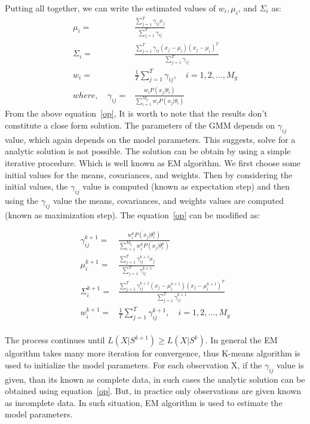 \begin{spacing}{1.5}
Putting all together, we can write the estimated values of $w_{i},\mu_{i}$, and $\Sigma_{i}$ as:
\begin{equation}
\begin{aligned}
\label{op}
\mu_{i}=&\frac{\sum_{j=1}^{T}\gamma_{ij}x_{j}}{\sum_{j=1}^{T}\gamma_{ij}}\\
\Sigma_{i}=&\frac{\sum_{j=1}^{T}\gamma_{ij}(x_{j}-\mu_{i})(x_{j}-\mu_{i})^{T}}{\sum_{j=1}^{T}\gamma_{ij}}\\
w_{i}=&\frac{1}{T}\sum_{j=1}^{T}\gamma_{ij}, \quad i=1,2,\ldots,M_{g}\\
where, \quad \gamma_{ij}=&\frac{w_{i}P(x_{j}|\theta_{i})}{{\sum_{i=1}^{M_{g}} w_{i}P(x_{j}|\theta_{i})}}
\end{aligned}
\end{equation}
From the above equation~\ref{op}, It is worth to note that the results don't constitute a close form solution. The parameters of the GMM depends on $\gamma_{ij}$ value, which again depends on the model parameters. This suggests, solve for a analytic solution is not possible. The solution can be obtain by using a simple iterative procedure. Which is well known as EM algorithm. We first choose some initial values for the means, covariances, and weights. Then by considering the initial values, the $\gamma_{ij}$ value is computed (known as expectation step) and then using the $\gamma_{ij}$ value the means, covariances, and weights values are computed (known as maximization step). The equation~\ref{op} can be modified as:

\begin{equation}
\begin{aligned}
\label{opi}
\gamma_{ij}^{k+1}=&\frac{w_{i}^{k}P(x_{j}|\theta_{i}^{k})}{{\sum_{i=1}^{M_{g}} w_{i}^{k}P(x_{j}|\theta_{i}^{k})}}\\
\mu_{i}^{k+1}=&\frac{\sum_{j=1}^{T}\gamma_{ij}^{k+1}x_{j}}{\sum_{j=1}^{T}\gamma_{ij}^{k+1}}\\
\Sigma_{i}^{k+1}=&\frac{\sum_{j=1}^{T}\gamma_{ij}^{k+1}(x_{j}-\mu_{i}^{k+1})(x_{j}-\mu_{i}^{k+1})^{T}}{\sum_{j=1}^{T}\gamma_{ij}^{k+1}}\\
w_{i}^{k+1}=&\frac{1}{T}\sum_{j=1}^{T}\gamma_{ij}^{k+1}, \quad i=1,2,\ldots,M_{g}\\
\end{aligned}
\end{equation}

The process continues until $L(X|S^{k+1}) \geq L(X|S^{k})$. In general the EM algorithm takes many more iteration for convergence, thus K-means algorithm is used to initialize the model parameters. For each observation X, if the $\gamma_{ij}$ value is given, than its known as complete data, in such cases the analytic solution can be obtained using equation~\ref{op}. But, in practice only observations are given known as incomplete data. In such situation, EM algorithm is used to estimate the model parameters.  

\end{spacing}
